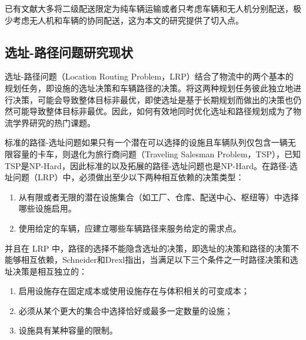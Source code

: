 \documentclass[fontset=none]{ctexart}
\begin{document}
已有文献大多将二级配送限定为纯车辆运输或者只考虑车辆和无人机分别配送，极少考虑无人机和车辆的协同配送，这为本文的研究提供了切入点。

\subsection{选址-路径问题研究现状}
选址-路径问题（Location Routing Problem，LRP）结合了物流中的两个基本的规划任务，即设施的选址决策和车辆路径的决策。将这两种规划任务彼此独立地进行决策，可能会导致整体目标非最优\cite{salhiEffectIgnoringRoutes1989, drexlSurveyVariantsExtensions2015}，即使选址是基于长期规划而做出的决策也仍然可能导致整体目标非最优\cite{salhiClusterInsertionHeuristic1999}。因此，如何有效地同时优化选址和路径规划成为了物流学界研究的热门课题\cite{albareda-sambolaLocationRoutingLocationArcRouting2015, balakrishnanIntegratedFacilityLocation1987, drexlSurveyVariantsExtensions2015, lopesTaxonomicalAnalysisCurrent2013, marinakisLocationRoutingProblem2008, nagyLocationroutingIssuesModels2007, prodhonSurveyRecentResearch2014, schneiderSurveyStandardLocationrouting2017, cavagniniRecentDevelopmentsLocationrouting2026, marinakisLocationRoutingProblem2024, wandeltLiteratureReviewHub2025, schifferVehicleRoutingLocation2019a}。

标准的路径-选址问题如果只有一个潜在可以选择的设施且车辆队列仅包含一辆无限容量的卡车，则退化为旅行商问题（Traveling Salesman Problem，TSP），已知TSP是NP-Hard\cite{computers-and-intractability}，因此标准的以及拓展的路径-选址问题也是NP-Hard。在路径-选址问题（LRP）中，必须做出至少以下两种相互依赖的决策类型：

\begin{enumerate}[label = (\roman*)]
    \item 从有限或者无限的潜在设施集合（如工厂、仓库、配送中心、枢纽等）中选择哪些设施启用。
    \item 使用给定的车辆，应建立哪些车辆路径来服务给定的需求点。
\end{enumerate}

并且在 LRP 中，路径的选择不能隐含选址的决策，即选址的决策和路径的决策不能够相互依赖，Schneider和Drexl指出，当满足以下三个条件之一时路径决策和选址决策是相互独立的\cite{schneiderSurveyStandardLocationrouting2017}：

\begin{enumerate}[label = (\roman*)]
    \item 启用设施存在固定成本或使用设施存在与体积相关的可变成本；
    \item 必须从某个更大的集合中选择恰好或最多一定数量的设施；
    \item 设施具有某种容量的限制。
\end{enumerate}
\end{document}
